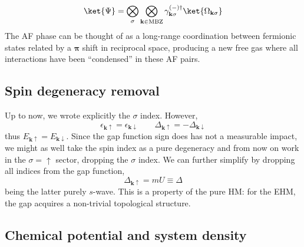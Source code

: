 \begin{equation}\label{appeq:af-hm-gs-4}
	\ket{\Psi} = \bigotimes_\sigma \bigotimes_{\mathbf{k}\in\mathrm{MBZ}} \gamma_{\mathbf{k}\sigma}^{(-)\dagger} \ket{\Omega_{\mathbf{k}\sigma}}
\end{equation}
The AF phase can be thought of as a long-range coordination between fermionic states related by a $\bm{\pi}$ shift in reciprocal space, producing a new free gas where all interactions have been ``condensed'' in these AF pairs.

\subsection{Spin degeneracy removal}

Up to now, we wrote explicitly the $\sigma$ index. However,
\[
	\epsilon_{\mathbf{k}\uparrow} = \epsilon_{\mathbf{k}\downarrow}
	\qquad
	\Delta_{\mathbf{k}\uparrow} = -\Delta_{\mathbf{k}\downarrow}
\]
thus $E_{\mathbf{k}\uparrow} = E_{\mathbf{k}\downarrow}$. Since the gap function sign does has not a measurable impact, we might as well take the spin index as a pure degeneracy and from now on work in the $\sigma=\uparrow$ sector, dropping the $\sigma$ index. We can further simplify by dropping all indices from the gap function,
\[
	\Delta_{\mathbf{k}\uparrow} = mU \equiv \Delta
\]
being the latter purely $s$-wave. This is a property of the pure HM: for the EHM, the gap acquires a non-trivial topological structure.

\subsection{Chemical potential and system density}

